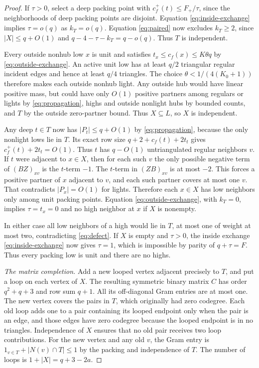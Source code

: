 \documentclass[11pt,reqno]{amsart}
\theoremstyle{definition}
\theoremstyle{remark}
\numberwithin{equation}{section}
\begin{document}
\begin{proof}
If \(\tau>0\), select a deep packing point with \(c_f^+(t)\le F_+/\tau\), since the neighborhoods of deep packing points are disjoint. Equation \eqref{eq:inside-exchange} implies \(\tau=o(q)\) as \(k_T=o(q)\). Equation \eqref{eq:paired} now excludes \(k_T\ge2\), since \(|X|\le q+O(1)\) and \(q-4-\tau-k_T=q-o(q)\). Thus \(T\) is independent.

Every outside nonhub low \(x\) is unit and satisfies \(t_x\le c_f(x)\le K\theta q\) by \eqref{eq:outside-exchange}. An active unit low has at least \(q/2\) triangular regular incident edges and hence at least \(q/4\) triangles. The choice \(\theta<1/(4(K_0+1))\) therefore makes each outside nonhub light. Any outside hub would have linear positive mass, but could have only \(O(1)\) positive partners among regulars or lights by \eqref{eq:propagation}, highs and outside nonlight hubs by bounded counts, and \(T\) by the outside zero-partner bound. Thus \(X\subseteq L\), so \(X\) is independent.

Any deep \(t\in T\) now has \(|P_t|\le q+O(1)\) by \eqref{eq:propagation}, because the only nonlight lows lie in \(T\). Its exact row size \(q+2+c_f(t)+2t_t\) gives \(c_f^+(t)+2t_t=O(1)\). Thus \(t\) has \(q-O(1)\) untriangulated regular neighbors \(v\). If \(t\) were adjacent to \(x\in X\), then for each such \(v\) the only possible negative term of \((BZ)_{xv}\) is the \(t\)-term \(-1\). The \(t\)-term in \((ZB)_{xv}\) is at most \(-2\). This forces a positive partner of \(x\) adjacent to \(v\), and each such partner covers at most one \(v\). That contradicts \(|P_x|=O(1)\) for lights. Therefore each \(x\in X\) has low neighbors only among unit packing points. Equation \eqref{eq:outside-exchange}, with \(k_T=0\), implies \(\tau=t_x=0\) and no high neighbor at \(x\) if \(X\) is nonempty.

In either case all low neighbors of a high would lie in \(T\), at most one of weight at most two, contradicting \eqref{eq:defect}. If \(X\) is empty and \(\tau>0\), the inside exchange \eqref{eq:inside-exchange} now gives \(\tau=1\), which is impossible by parity of \(q+\tau=F\). Thus every packing low is unit and there are no highs.

\textit{The matrix completion.} Add a new looped vertex adjacent precisely to \(T\), and put a loop on each vertex of \(X\). The resulting symmetric binary matrix \(C\) has order \(q^2+q+3\) and row sum \(q+1\). All its off-diagonal Gram entries are at most one. The new vertex covers the pairs in \(T\), which originally had zero codegree. Each old loop adds one to a pair containing its looped endpoint only when the pair is an edge, and those edges have zero codegree because the looped endpoint is in no triangles. Independence of \(X\) ensures that no old pair receives two loop contributions. For the new vertex and any old \(v\), the Gram entry is \(1_{v\in T}+|N(v)\cap T|\le1\) by the packing and independence of \(T\). The number of loops is \(1+|X|=q+3-2a\).
\end{proof}
\end{document}
